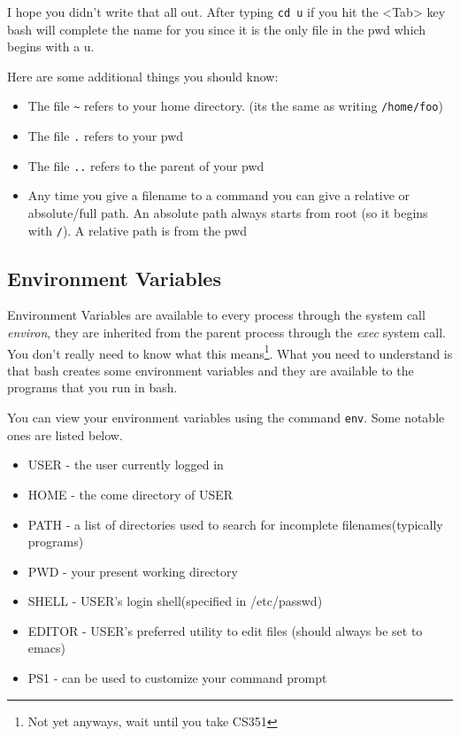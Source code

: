 \documentclass[10pt]{article}
\begin{document}
  I hope you didn't write that all out. After typing \texttt{cd u} if you hit the <Tab> key bash
  will complete the name for you since it is the only file in the pwd which begins with a u.

  Here are some additional things you should know:
  \begin{itemize}
    \item 
      The file \texttt{\~} refers to your home directory. (its the same as writing \texttt{/home/foo})
    \item 
      The file \texttt{.} refers to your pwd
    \item
      The file \texttt{..} refers to the parent of your pwd
    \item
      Any time you give a filename to a command you can give a relative or absolute/full path.
      An absolute path always starts from root (so it begins with \texttt{/}).
      A relative path is from the pwd
  \end{itemize}
  
  \subsection{Environment Variables}
  Environment Variables are available to every process through the system call \textit{environ}, they are inherited from the parent process through the \textit{exec} system call. You don't really need to know what this means\footnote{Not yet anyways, wait until you take CS351}. What you need to understand is that bash creates some environment variables and they are available to the programs that you run in bash. 

  You can view your environment variables using the command \texttt{env}. Some notable ones are listed below.

  \begin{itemize}
    \item
      USER - the user currently logged in
    \item
      HOME - the come directory of USER
    \item
      PATH - a list of directories used to search for incomplete filenames(typically programs)
    \item
      PWD  -  your present working directory
    \item
      SHELL - USER's login shell(specified in /etc/passwd)
    \item
      EDITOR - USER's preferred utility to edit files (should always be set to emacs)
    \item
      PS1   -  can be used to customize your command prompt
  \end{itemize}
\end{document}
